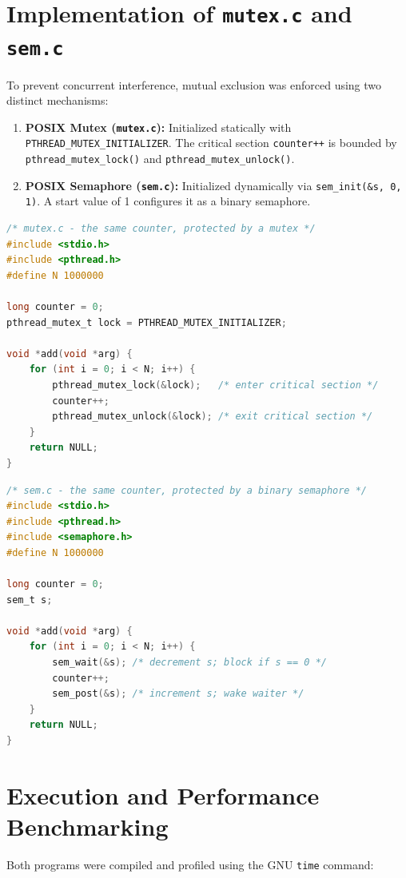\documentclass[12pt,a4paper]{report}
\numberwithin{equation}{chapter}
\numberwithin{figure}{chapter}
\numberwithin{table}{chapter}
\begin{document}
\section{Implementation of \texttt{mutex.c} and \texttt{sem.c}}
To prevent concurrent interference, mutual exclusion was enforced using two distinct mechanisms:
\begin{enumerate}
    \item \textbf{POSIX Mutex (\texttt{mutex.c}):} Initialized statically with \texttt{PTHREAD\_MUTEX\_INITIALIZER}. The critical section \texttt{counter++} is bounded by \texttt{pthread\_mutex\_lock()} and \texttt{pthread\_mutex\_unlock()}.
    \item \textbf{POSIX Semaphore (\texttt{sem.c}):} Initialized dynamically via \texttt{sem\_init(\&s, 0, 1)}. A start value of 1 configures it as a binary semaphore.
\end{enumerate}

\begin{lstlisting}[language=C]
/* mutex.c - the same counter, protected by a mutex */
#include <stdio.h>
#include <pthread.h>
#define N 1000000

long counter = 0;
pthread_mutex_t lock = PTHREAD_MUTEX_INITIALIZER;

void *add(void *arg) {
    for (int i = 0; i < N; i++) {
        pthread_mutex_lock(&lock);   /* enter critical section */
        counter++;                   
        pthread_mutex_unlock(&lock); /* exit critical section */
    }
    return NULL;
}
\end{lstlisting}

\begin{lstlisting}[language=C]
/* sem.c - the same counter, protected by a binary semaphore */
#include <stdio.h>
#include <pthread.h>
#include <semaphore.h>
#define N 1000000

long counter = 0;
sem_t s;

void *add(void *arg) {
    for (int i = 0; i < N; i++) {
        sem_wait(&s); /* decrement s; block if s == 0 */
        counter++;
        sem_post(&s); /* increment s; wake waiter */
    }
    return NULL;
}
\end{lstlisting}

\section{Execution and Performance Benchmarking}
Both programs were compiled and profiled using the GNU \texttt{time} command:
\end{document}
